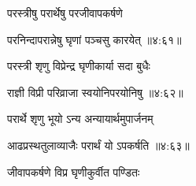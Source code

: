 {\devanagarifont परस्त्रीषु परार्थेषु परजीवापकर्षणे \thinspace{\dandab} \dontdisplaylinenum }%


{\devanagarifont परनिन्दापरान्नेषु घृणां पञ्चसु कारयेत् {॥४:६१॥} \veg\dontdisplaylinenum }%

{\devanagarifont परस्त्री शृणु विप्रेन्द्र घृणीकार्या सदा बुधैः \thinspace{\dandab} \dontdisplaylinenum }%


{\devanagarifont राज्ञी विप्री परिव्राजा स्वयोनिपरयोनिषु {॥४:६२॥} \veg\dontdisplaylinenum }%

{\devanagarifont परार्थे शृणु भूयो ऽन्य अन्यायार्थमुपार्जनम् \thinspace{\dandab} \dontdisplaylinenum }%


{\devanagarifont आढप्रस्थतुलाव्याजैः परार्थं यो ऽपकर्षति {॥४:६३॥} \veg\dontdisplaylinenum }%

{\devanagarifont जीवापकर्षणे विप्र घृणीकुर्वीत पण्डितः \thinspace{\dandab} \dontdisplaylinenum }%

